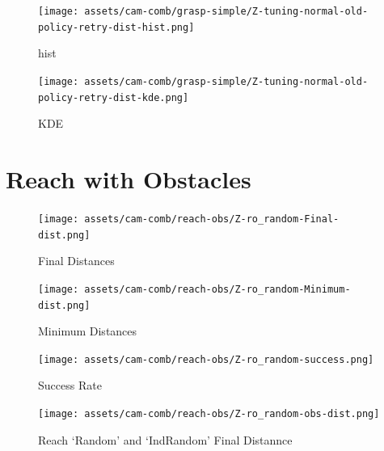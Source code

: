   \begin{figure}[H]
    \centering
    \texttt{[image: assets/cam-comb/grasp-simple/Z-tuning-normal-old-policy-retry-dist-hist.png]}
    \caption{hist}
  \end{figure}

  \begin{figure}[H]
    \centering
    \texttt{[image: assets/cam-comb/grasp-simple/Z-tuning-normal-old-policy-retry-dist-kde.png]}
    \caption{KDE}
  \end{figure}




\section{Reach with Obstacles}
  \begin{figure}[H]
    \centering
    \texttt{[image: assets/cam-comb/reach-obs/Z-ro\_random-Final-dist.png]}
    \caption{Final Distances}
  \end{figure}

  \begin{figure}[H]
    \centering
    \texttt{[image: assets/cam-comb/reach-obs/Z-ro\_random-Minimum-dist.png]}
    \caption{Minimum Distances}
  \end{figure}

  \begin{figure}[H]
    \centering
    \texttt{[image: assets/cam-comb/reach-obs/Z-ro\_random-success.png]}
    \caption{Success Rate}
  \end{figure}

  \begin{figure}[htpb]
    \centering
    \texttt{[image: assets/cam-comb/reach-obs/Z-ro\_random-obs-dist.png]}
    \caption{Reach `Random' and `IndRandom' Final Distannce}
  \end{figure}

